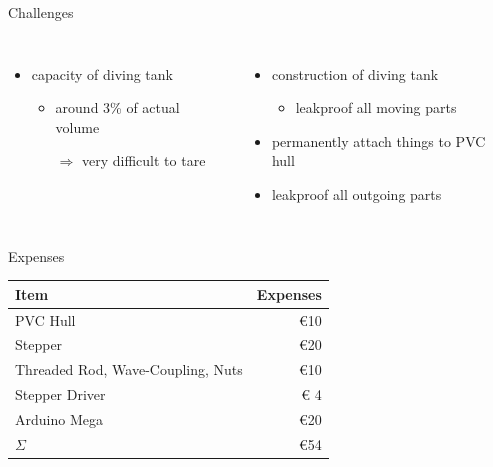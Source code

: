 \documentclass{beamer}
\begin{document}
	\begin{frame}{Challenges}
		\begin{columns}
				\begin{itemize}
					\item capacity of diving tank
						\begin{itemize}
							\item around 3\% of actual volume
							\item[$\Rightarrow$] very difficult to tare
						\end{itemize}
				\end{itemize}
				\begin{itemize}
					\item construction of diving tank
						\begin{itemize}
							\item leakproof all moving parts
						\end{itemize}
					\item permanently attach things to PVC hull
					\item leakproof all outgoing parts
				\end{itemize}
		\end{columns}
	\end{frame}
	
	\begin{frame}{Expenses}
		\begin{center}
			\begin{tabular}{|lr|}
				\hline
				Item & Expenses \\\hline
				PVC Hull & \euro{10}\\
				Stepper & \euro{20}\\
				Threaded Rod, Wave-Coupling, Nuts & \euro{10}\\
				Stepper Driver & \euro{ 4}\\
				Arduino Mega & \euro{20}\\\hline
				$\Sigma$ & \euro{54}\\
				\hline
			\end{tabular}
		\end{center}
	\end{frame}
	
\end{document}
